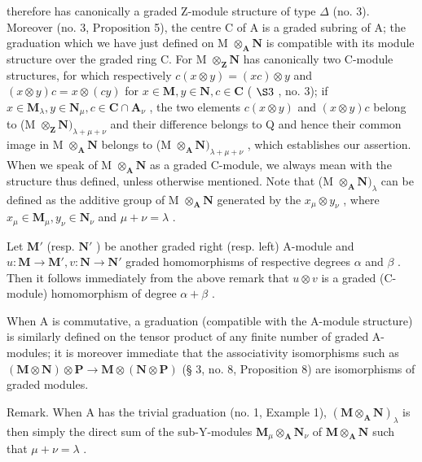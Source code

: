 therefore has canonically a graded Z-module structure of type \(\Delta\) (no. 3). Moreover (no. 3, Proposition 5), the centre C of A is a graded subring of A; the graduation which we have just defined on M \(\otimes_{\mathbf{A}} \mathbf{N}\) is compatible with its module structure over the graded ring C. For M \(\otimes_{\mathbf{Z}} \mathbf{N}\) has canonically two C-module structures, for which respectively \(c(x \otimes y) = (xc) \otimes y\) and \((x \otimes y)c = x \otimes (cy)\) for \(x \in \mathbf{M}, y \in \mathbf{N}, c \in \mathbf{C}\) ( \(\S 3\) , no. 3); if \(x \in \mathbf{M}_{\lambda}, y \in \mathbf{N}_{\mu}, c \in \mathbf{C} \cap \mathbf{A}_{\nu}\) , the two elements \(c(x \otimes y)\) and \((x \otimes y)c\) belong to (M \(\otimes_{\mathbf{Z}} \mathbf{N})_{\lambda + \mu + \nu}\) and their difference belongs to Q and hence their common image in M \(\otimes_{\mathbf{A}} \mathbf{N}\) belongs to (M \(\otimes_{\mathbf{A}} \mathbf{N})_{\lambda + \mu + \nu}\) , which establishes our assertion. When we speak of M \(\otimes_{\mathbf{A}} \mathbf{N}\) as a graded C-module, we always mean with the structure thus defined, unless otherwise mentioned. Note that (M \(\otimes_{\mathbf{A}} \mathbf{N})_{\lambda}\) can be defined as the additive group of M \(\otimes_{\mathbf{A}} \mathbf{N}\) generated by the \(x_{\mu} \otimes y_{\nu}\) , where \(x_{\mu} \in \mathbf{M}_{\mu}, y_{\nu} \in \mathbf{N}_{\nu}\) and \(\mu + \nu = \lambda\) .

Let \(\mathbf{M}'\) (resp. \(\mathbf{N}'\) ) be another graded right (resp. left) A-module and \(u: \mathbf{M} \to \mathbf{M}', v: \mathbf{N} \to \mathbf{N}'\) graded homomorphisms of respective degrees \(\alpha\) and \(\beta\) . Then it follows immediately from the above remark that \(u \otimes v\) is a graded (C-module) homomorphism of degree \(\alpha + \beta\) .

When A is commutative, a graduation (compatible with the A-module structure) is similarly defined on the tensor product of any finite number of graded A-modules; it is moreover immediate that the associativity isomorphisms such as \((\mathbf{M} \otimes \mathbf{N}) \otimes \mathbf{P} \to \mathbf{M} \otimes (\mathbf{N} \otimes \mathbf{P})\) (§ 3, no. 8, Proposition 8) are isomorphisms of graded modules.

Remark. When A has the trivial graduation (no. 1, Example 1), \((\mathbf{M} \otimes_{\mathbf{A}} \mathbf{N})_{\lambda}\) is then simply the direct sum of the sub-Y-modules \(\mathbf{M}_{\mu} \otimes_{\mathbf{A}} \mathbf{N}_{\nu}\) of \(\mathbf{M} \otimes_{\mathbf{A}} \mathbf{N}\) such that \(\mu + \nu = \lambda\) .

